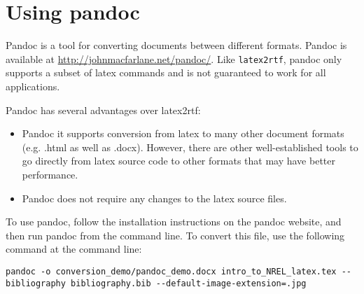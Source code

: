 \section{Using pandoc}
Pandoc is a tool for converting documents between different formats. Pandoc is available at \href{http://johnmacfarlane.net/pandoc/}{http://johnmacfarlane.net/pandoc/}. Like \texttt{latex2rtf}, pandoc only supports a subset of latex commands and is not guaranteed to work for all applications.

Pandoc has several advantages over latex2rtf:
\begin{itemize}
\item Pandoc it supports conversion from latex to many other document formats (e.g. .html as well as .docx). However, there are other well-established tools to go directly from latex source code to other formats that may have better performance.
\item Pandoc does not require any changes to the latex source files.
\end{itemize}

To use pandoc, follow the installation instructions on the pandoc website, and then run pandoc from the command line. To convert this file, use the following command at the command line:

\begin{verbatim}
pandoc -o conversion_demo/pandoc_demo.docx intro_to_NREL_latex.tex --bibliography bibliography.bib --default-image-extension=.jpg
\end{verbatim}

